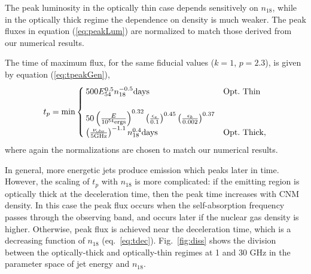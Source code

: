 \documentclass[usenatbib,fleqn]{mnras}
\begin{document}
The peak luminosity in the optically thin case depends sensitively on
$n_{18}$, while in the optically thick regime the dependence on
density is much weaker.  The peak fluxes in equation (\ref{eq:peakLum}) are normalized to match those derived from our numerical results. 

The time of maximum flux, for the same fiducial values ($k = 1$,
$p=2.3$), is given by equation (\ref{eq:tpeakGen}),
\begin{align}
t_p= \text{min}
\begin{cases}
  500 E_{54}^{0.5} n_{18}^{-0.5} {\rm days} & {\rm Opt.~Thin}\\\\
  50 \left(\frac{E}{10^{54} {\rm ergs}}\right)^{0.32}
  \left(\frac{\epsilon_e}{0.1}\right)^{0.45}
  \left(\frac{\epsilon_b}{0.002}\right)^{0.37}\\
  \left(\frac{\nu_{\rm obs}}{5 {\rm GHz}}\right)^{-1.1} n_{18}^{0.4}
  {\rm days}& {\rm Opt.~Thick},
\end{cases}
\label{eq:peakTime}
\end{align}
where again the normalizations are chosen to match our numerical
results. 

In general, more energetic jets produce emission which
peaks later in time.  However, the scaling of $t_p$ with $n_{18}$ is
more complicated: if the emitting region is optically thick at the
deceleration time, then the peak time increases with CNM density. In this
case the peak flux occurs when the self-absorption frequency passes through
the observing band, and occurs later if the nuclear gas density is
higher. Otherwise, peak flux is achieved near the deceleration time,
which is a decreasing function of $n_{18}$ (eq.~\ref{eq:tdec}).
Fig.~\ref{fig:diss} shows the division between the optically-thick and
optically-thin regimes at 1 and 30 GHz in the parameter space of jet energy and $n_{18}$.
\end{document}
